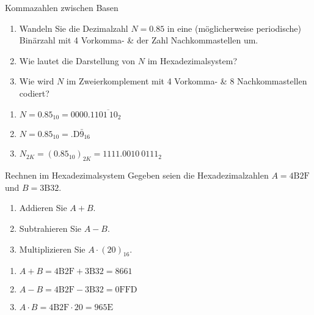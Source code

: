 \documentclass{article}
\begin{document}
\begin{exercise}{Kommazahlen zwischen Basen}
  \begin{enumerate}
    \item Wandeln Sie die Dezimalzahl $N = 0.85$ in eine (möglicherweise periodische) Binärzahl mit 4 Vorkomma- \& der Zahl Nachkommastellen um.
    \item Wie lautet die Darstellung von $N$ im Hexadezimalsystem?
    \item Wie wird $N$ im Zweierkomplement mit 4 Vorkomma- \& 8 Nachkommastellen codiert?
  \end{enumerate}

  \begin{solution}
    \begin{enumerate}
      \item $N = 0.85_{10} = {0000.11\overline{01\ 10}}_2$
      \item $N = 0.85_{10} = {\mathrm{.D\bar{9}}}_{16}$
      \item ${N}_{2K} = (0.85_{10})_{2K} = {1111.0010\ 0111}_2$
    \end{enumerate}
  \end{solution}
\end{exercise}

\begin{exercise}{Rechnen im Hexadezimalsystem}
  Gegeben seien die Hexadezimalzahlen $A = \mathrm{4B2F}$ und $B = \mathrm{3B32}$.
  \begin{enumerate}
    \item Addieren Sie $A+B$.
    \item Subtrahieren Sie $A-B$.
    \item Multiplizieren Sie $A\cdot (20)_{16}$.
  \end{enumerate}

  \begin{solution}
    \begin{enumerate}
      \item $A + B = \mathrm{4B2F} + \mathrm{3B32} = \mathrm{8661}$
      \item $A - B = \mathrm{4B2F} - \mathrm{3B32} = \mathrm{0FFD}$
      \item $A \cdot B = \mathrm{4B2F} \cdot 20 = \mathrm{965E}$
    \end{enumerate}
  \end{solution}
\end{exercise}
\end{document}
